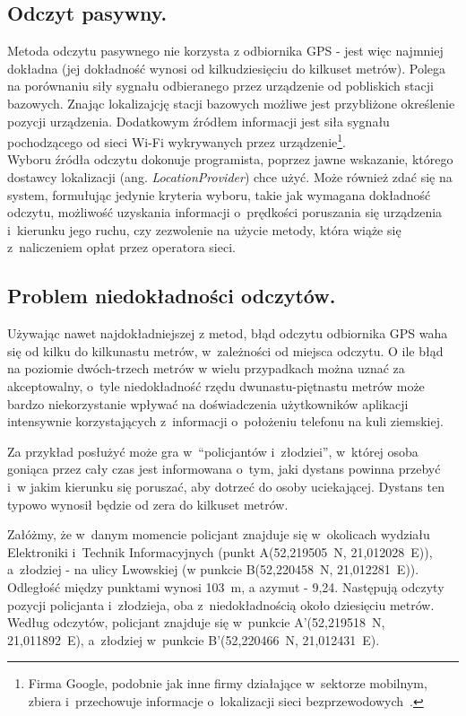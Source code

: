 \documentclass[a4paper,twocolumn,11pt]{article}
\begin{document}
\subsection{Odczyt pasywny.}
 Metoda odczytu pasywnego nie korzysta z odbiornika GPS - jest więc najmniej dokładna (jej dokładność wynosi od kilkudziesięciu do kilkuset metrów).
 Polega na porównaniu siły sygnału odbieranego przez urządzenie od pobliskich stacji bazowych.
 Znając lokalizajcję stacji bazowych możliwe jest przybliżone określenie pozycji urządzenia.
 Dodatkowym źródłem informacji jest siła sygnału pochodzącego od sieci Wi-Fi wykrywanych przez urządzenie\footnote{Firma Google, podobnie jak inne firmy działające w~sektorze mobilnym, zbiera i~przechowuje informacje o~lokalizacji sieci bezprzewodowych~\cite{wifi:loc}.}.\\

Wyboru źródła odczytu dokonuje programista, poprzez jawne wskazanie, którego dostawcy lokalizacji (ang. \emph{LocationProvider}) chce użyć.
Może również zdać się na system, formułując jedynie kryteria wyboru, takie jak wymagana dokładność odczytu, możliwość uzyskania informacji o~prędkości poruszania się urządzenia i~kierunku jego ruchu, czy zezwolenie na użycie metody, która wiąże się z~naliczeniem opłat przez operatora sieci.


\subsection{Problem niedokładności odczytów.}
 Używając nawet najdokładniejszej z metod, błąd odczytu odbiornika GPS waha się od kilku do kilkunastu metrów, w~zależności od miejsca odczytu.
 O ile błąd na poziomie dwóch-trzech metrów w wielu przypadkach można uznać za akceptowalny, o~tyle niedokładność rzędu dwunastu-piętnastu metrów może bardzo niekorzystanie wpływać na doświadczenia użytkowników aplikacji intensywnie korzystających z~informacji o~położeniu telefonu na kuli ziemskiej.
 
 Za przykład posłużyć może gra w~``policjantów i~złodziei'', w~której osoba goniąca przez cały czas jest informowana o~tym, jaki dystans powinna przebyć i~w jakim kierunku się poruszać, aby dotrzeć do osoby uciekającej.
 Dystans ten typowo wynosił będzie od zera do kilkuset metrów.
 
 Załóżmy, że w~danym momencie policjant znajduje się w~okolicach wydziału Elektroniki i~Technik Informacyjnych (punkt A(52,219505\textdegree~N, 21,012028\textdegree~E)), a~złodziej - na ulicy Lwowskiej (w punkcie B(52,220458\textdegree~N, 21,012281\textdegree~E)).
 Odległość między punktami wynosi 103~m, a azymut - 9,24\textdegree.
 Następują odczyty pozycji policjanta i~złodzieja, oba z~niedokładnością około dziesięciu metrów.
 Według odczytów, policjant znajduje się w~punkcie A'(52,219518\textdegree~N, 21,011892\textdegree~E), a~złodziej w~punkcie B'(52,220466\textdegree~N, 21,012431\textdegree~E).
 
\end{document}
